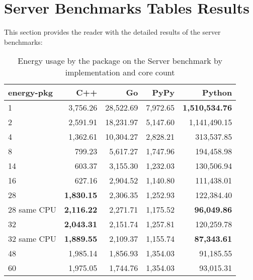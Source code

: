 \chapter{Server Benchmarks Tables Results}
\label{chap:appendix-server-benchmarks}
This section provides the reader with the detailed results of the server benchmarks:

\begin{table}[h]
    \centering
    \begin{tabular}{lrrrr}
        \hline
        energy-pkg     & C++                & Go         & PyPy       & Python        \\
        \hline
        1              & 3,756.26            & 28,522.69   & 7,972.65   & \textbf{1,510,534.76}  \\
        2              & 2,591.91            & 18,231.97   & 5,147.60   & 1,141,490.15           \\
        4              & 1,362.61            & 10,304.27   & 2,828.21   &   313,537.85           \\
        8	           &   799.23 	         & 5,617.27    & 1,747.96   &	194,458.98           \\ 
        14             &   603.37            & 3,155.30    & 1,232.03   &   130,506.94           \\
        16             &   627.16            & 2,904.52    & 1,140.80   &   111,438.01           \\
        28             & \textbf{1,830.15}   & 2,306.35    & 1,252.93   &   122,384.40           \\
        28 same CPU    & \textbf{2,116.22}   & 2,271.71    & 1,175.52   &   \textbf{96,049.86}   \\
        32             & \textbf{2,043.31}   & 2,151.74    & 1,257.81   &   120,259.78           \\
        32 same CPU    & \textbf{1,889.55}   & 2,109.37    & 1,155.74   &   \textbf{87,343.61}   \\
        48             &   1,985.14          & 1,856.93    & 1,354.03   &    91,185.55           \\
        60             &   1,975.05          & 1,744.76    & 1,354.03   &    93,015.31           \\
        \hline
    \end{tabular}
\caption[Server - Package energy consumption]{Energy usage by the package on the Server benchmark by implementation and core count}
\label{tab:server-energy-pkg}
\end{table}

